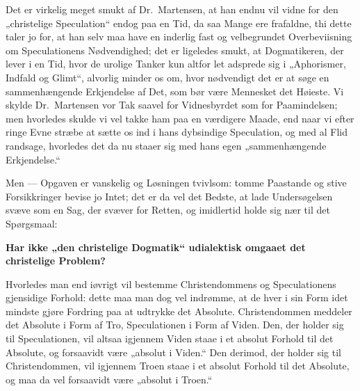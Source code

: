  Det er virkelig meget smukt af Dr.\ Martensen, at han endnu vil
vidne for den „christelige Speculation“ endog paa en Tid, da saa
Mange ere frafaldne, thi dette taler jo for, at han selv maa have
en inderlig fast og velbegrundet Overbeviisning om Speculationens
Nødvendighed; det er ligeledes smukt, at Dogmatikeren, der lever i
en Tid, hvor de urolige Tanker kun altfor let adsprede sig i
„Aphorismer, Indfald og Glimt“, alvorlig minder os om, hvor
nødvendigt det er at søge en sammenhængende Erkjendelse af Det,
som bør være Mennesket det Høieste. Vi skylde Dr.\ Martensen vor
Tak saavel for Vidnesbyrdet som for Paamindelsen; men hvorledes
skulde vi vel takke ham paa en værdigere Maade, end naar vi efter
ringe Evne stræbe at sætte os ind i hans dybsindige Speculation,
og med al Flid randsage, hvorledes det da nu staaer sig med hans
egen „sammenhængende Erkjendelse.“

Men --- Opgaven er vanskelig og Løsningen tvivlsom: tomme
Paastande og stive Forsikkringer bevise jo Intet; det er da vel
det Bedste, at lade Undersøgelsen svæve som en Sag, der svæver for
Retten, og imidlertid holde sig nær til det Spørgsmaal:

\begin{center}
{\large\bfseries Har ikke „den christelige Dogmatik“ udialektisk
omgaaet det christelige Problem?\par}
\end{center}

Hvorledes man end iøvrigt vil bestemme Christendommens og
Speculationens gjensidige Forhold: dette maa man dog vel
indrømme, at de hver i sin Form idet%
mindste gjøre Fordring paa at udtrykke det Absolute.
Christendommen meddeler det Absolute i Form af Tro, Speculationen
i Form af Viden. Den, der holder sig til Speculationen, vil altsaa
igjennem Viden staae i et absolut Forhold til det Absolute, og
forsaavidt være „absolut i Viden.“ Den derimod, der holder sig til
Christendommen, vil igjennem Troen staae i et absolut Forhold til
det Absolute, og maa da vel forsaavidt være „absolut i Troen.“

